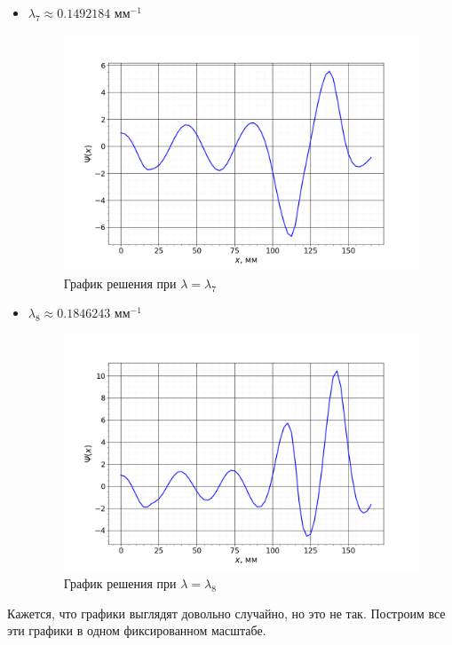 \begin{itemize}
		
			\item $\lambda_7 \approx 0.1492184$ мм$^{-1}$
			\begin{figure}[h!]
				\centering
				\includegraphics[width=0.92\linewidth]{Pictures/Normal/7.png}
				\caption{График решения при $\lambda = \lambda_7$}
			\end{figure}
		
		
			\newpage
			\item $\lambda_8 \approx 0.1846243$ мм$^{-1}$
			\begin{figure}[h!]
				\centering
				\includegraphics[width=0.92\linewidth]{Pictures/Normal/8.png}
				\caption{График решения при $\lambda = \lambda_8$}
			\end{figure}
		
		\end{itemize}
	
	
		\newpage
		Кажется, что графики выглядят довольно случайно, но это не так. Построим все эти графики в одном фиксированном масштабе.
		
